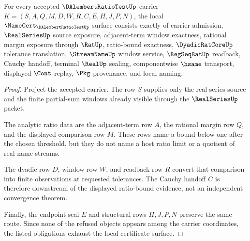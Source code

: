 \begin{theorem}
\label{thm:dalembert-ratio-test-namecert-obligations}
For every accepted $\DAlembertRatioTestUp$ carrier $K=(S,A,Q,M,D,W,R,C,E,H,J,P,N)$, the local $\NameCert_{\DAlembertRatioTestUp}$ surface consists exactly of carrier admission, $\RealSeriesUp$ source exposure, adjacent-term window exactness, rational margin exposure through $\RatUp$, ratio-bound exactness, $\DyadicRatCoreUp$ tolerance translation, $\StreamNameUp$ window service, $\RegSeqRatUp$ readback, Cauchy handoff, terminal $\RealUp$ sealing, componentwise $\hsame$ transport, displayed $\Cont$ replay, $\Pkg$ provenance, and local naming.
\end{theorem}
\begin{proof}
Project the accepted carrier. The row $S$ supplies only the real-series source and the finite partial-sum windows already visible through the $\RealSeriesUp$ packet.

The analytic ratio data are the adjacent-term row $A$, the rational margin row $Q$, and the displayed comparison row $M$. These rows name a bound below one after the chosen threshold, but they do not name a host ratio limit or a quotient of real-name streams.

The dyadic row $D$, window row $W$, and readback row $R$ convert that comparison into finite observations at requested tolerances. The Cauchy handoff $C$ is therefore downstream of the displayed ratio-bound evidence, not an independent convergence theorem.

Finally, the endpoint seal $E$ and structural rows $H,J,P,N$ preserve the same route. Since none of the refused objects appears among the carrier coordinates, the listed obligations exhaust the local certificate surface.
\end{proof}

